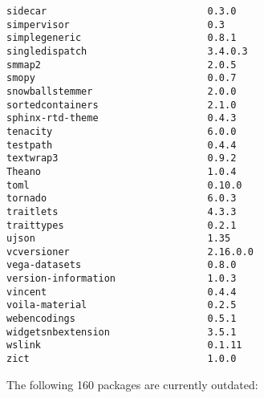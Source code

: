 \documentclass[11pt,a4paper]{article}
\begin{document}
\begin{verbatim}
sidecar                            0.3.0
simpervisor                        0.3
simplegeneric                      0.8.1
singledispatch                     3.4.0.3
smmap2                             2.0.5
smopy                              0.0.7
snowballstemmer                    2.0.0
sortedcontainers                   2.1.0
sphinx-rtd-theme                   0.4.3
tenacity                           6.0.0
testpath                           0.4.4
textwrap3                          0.9.2
Theano                             1.0.4
toml                               0.10.0
tornado                            6.0.3
traitlets                          4.3.3
traittypes                         0.2.1
ujson                              1.35
vcversioner                        2.16.0.0
vega-datasets                      0.8.0
version-information                1.0.3
vincent                            0.4.4
voila-material                     0.2.5
webencodings                       0.5.1
widgetsnbextension                 3.5.1
wslink                             0.1.11
zict                               1.0.0
\end{verbatim}
%
The following 160 packages are currently outdated:
%
\end{document}
